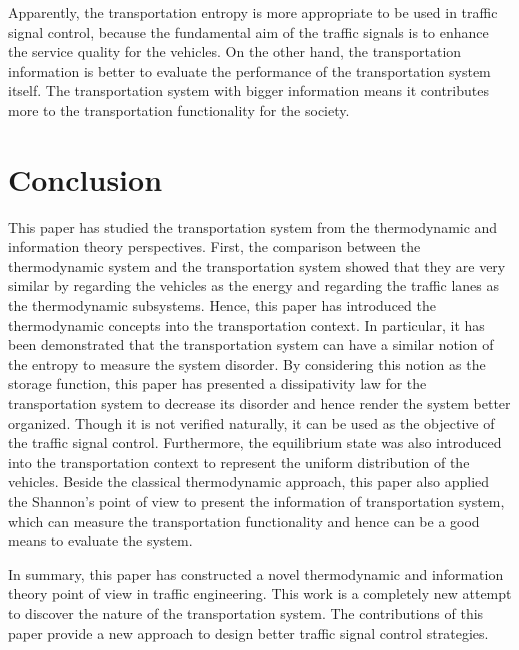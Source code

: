 \documentclass[preprint,authoryear,12pt]{elsarticle}
\begin{document}
Apparently, the transportation entropy is more appropriate to be used in traffic signal control, because the fundamental aim of the traffic signals is to enhance the service quality for the vehicles. On the other hand, the transportation information is better to evaluate the performance of the transportation system itself. The transportation system with bigger information means it contributes more to the transportation functionality for the society.


\section{Conclusion}

This paper has studied the transportation system from the thermodynamic and information theory perspectives. First, the comparison between the thermodynamic system and the transportation system showed that they are very similar by regarding the vehicles as the energy and regarding the traffic lanes as the thermodynamic subsystems. Hence, this paper has introduced the thermodynamic concepts into the transportation context. In particular, it has been demonstrated that the transportation system can have a similar notion of the entropy to measure the system disorder. By considering this notion as the storage function, this paper has presented a dissipativity law for the transportation system to decrease its disorder and hence render the system better organized. Though it is not verified naturally, it can be used as the objective of the traffic signal control. Furthermore, the equilibrium state was also introduced into the transportation context to represent the uniform distribution of the vehicles. Beside the 
classical thermodynamic approach, this paper also applied the Shannon's point of view to present the information of transportation system, which can measure the transportation functionality and hence can be a good means to evaluate the system.

In summary, this paper has constructed a novel thermodynamic and information theory point of view in traffic engineering. This work is a completely new attempt to discover the nature of the transportation system. The contributions of this paper provide a new approach to design better traffic signal control strategies.



\end{document}
